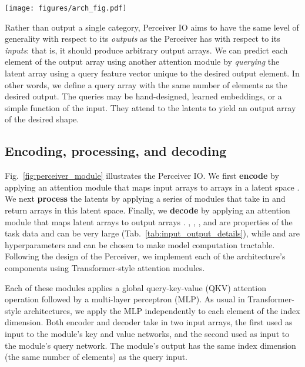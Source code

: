 \documentclass{article} \usepackage{iclr2022_conference,times}
\newcommand{\ourmodel}{Perceiver IO\xspace}
\begin{document}
\begin{figure*}[t]
    \centering
    \texttt{[image: figures/arch\_fig.pdf]}
    \caption{The \ourmodel{} architecture. \ourmodel{} maps arbitrary input arrays to arbitrary output arrays in a domain agnostic process. The bulk of the computation happens in a latent space whose size is typically smaller than the inputs and outputs, which makes the process computationally tractable even for very large inputs \& outputs. See Fig.~\ref{fig:encode_process_decode} for a more detailed look at encode, process, and decode attention.}
    \label{fig:perceiver_module}
    \vspace{-20pt}
\end{figure*}

Rather than output a single category, \ourmodel{} aims to have the same level of generality with respect to its \emph{outputs} as the Perceiver has with respect to its \emph{inputs}: that is, it should produce arbitrary output arrays. We can predict each element of the output array using another attention module by \emph{querying} the latent array using a query feature vector unique to the desired output element.  
In other words, we define a query array with the same number of elements as the desired output. The queries may be hand-designed, learned embeddings, or a simple function of the input. They attend to the latents to yield an output  array of the desired shape.

\subsection{Encoding, processing, and decoding}
Fig.~\ref{fig:perceiver_module} illustrates the \ourmodel{}. We first \textbf{encode} by applying an attention module that maps input arrays  to arrays in a latent space . We next \textbf{process} the latents  by applying a series of modules that take in and return arrays in this latent space. 
Finally, we \textbf{decode} by applying an attention module that maps latent arrays to output arrays . , , , and  are properties of the task data and can be very large (Tab.~\ref{tab:input_output_details}), while  and  are hyperparameters and can be chosen to make model computation tractable. Following the design of the Perceiver, we implement each of the architecture's components using Transformer-style attention modules. 

Each of these modules applies a global query-key-value (QKV) attention operation followed by a multi-layer perceptron (MLP). As usual in Transformer-style architectures, we apply the MLP independently to each element of the index dimension. Both encoder and decoder take in two input arrays, the first used as input to the module's key and value networks, and the second used as input to the module's query network. The module's output has the same index dimension (the same number of elements) as the query input.
\end{document}

